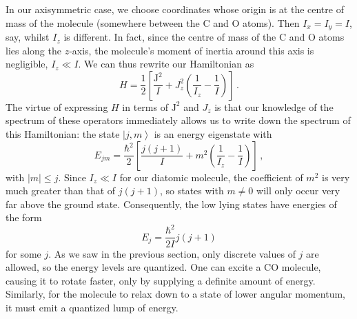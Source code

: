 \documentclass{article}
\theoremstyle{plain}\theoremheaderfont{\normalfont\itshape}\theorembodyfont{\rmfamily}\theoremseparator{.}\newtheorem*{rem}{Remark}\newtheorem*{ex}{Example}\newtheorem*{proof}{Proof}\newtheorem*{altp}{Alternative proof}
\theoremstyle{plain}\theoremheaderfont{\normalfont\bfseries}\theorembodyfont{\rmfamily}\theoremseparator{.}\newtheorem{thm}{Theorem}[section]\newtheorem{lem}[thm]{Lemma}\newtheorem{prop}[thm]{Proposition}\newtheorem*{cor}{Corollary}\newtheorem{defn}[thm]{Definition}\newtheorem{clm}[thm]{Claim}\newtheorem{clminproof}{Claim}
\theoremstyle{break}\theoremheaderfont{\normalfont\itshape}\theorembodyfont{\rmfamily}\theoremseparator{.\medskip}\newtheorem*{proofskip}{Proof}\newtheorem*{exs}{Examples}\newtheorem*{rems}{Remarks}
\theoremstyle{break}\theoremheaderfont{\normalfont\bfseries}\theorembodyfont{\rmfamily}\theoremseparator{.\medskip}\newtheorem{lemskip}[thm]{Lemma}\newtheorem{defnskip}[thm]{Definition}\newtheorem{propskip}[thm]{Proposition}\newtheorem{thmskip}[thm]{Theorem}
\numberwithin{equation}{section}
\newcommand{\ket}[1]{\left| #1 \right\rangle}
\newcommand{\vb}[1]{\bm{\mathrm{#1}}}
\newcommand{\abs}[1]{\left| #1 \right|}
\begin{document}
    In our axisymmetric case, we choose coordinates whose origin is at the centre of mass of the molecule (somewhere between the \(\mathrm{C}\) and \(\mathrm{O}\) atoms). Then \(I_x=I_y=I\), say, whilst \(I_z\) is different. In fact, since the centre of mass of the \(\mathrm{C}\) and \(\mathrm{O}\) atoms lies along the \(z\)-axis, the molecule's moment of inertia around this axis is negligible, \(I_z\ll I\). We can thus rewrite our Hamiltonian as
    \begin{equation}
        H=\frac{1}{2}\left[\frac{\vb{J}^2}{I}+J_z^2\left(\frac{1}{I_z}-\frac{1}{I}\right)\right]\,.
    \end{equation}
    The virtue of expressing \(H\) in terms of \(\vb{J}^2\) and \(J_z\) is that our knowledge of the spectrum of these operators immediately allows us to write down the spectrum of this Hamiltonian: the state \(\ket{j,m}\) is an energy eigenstate with
    \begin{equation}
        E_{jm}=\frac{\hbar^2}{2}\left[\frac{j(j+1)}{I}+m^2\left(\frac{1}{I_z}-\frac{1}{I}\right)\right]\,,
    \end{equation}
    with \(\abs{m}\le j\). Since \(I_z\ll I\) for our diatomic molecule, the coefficient of \(m^2\) is very much greater than that of \(j(j+1)\), so states with \(m\ne 0\) will only occur very far above the ground state. Consequently, the low lying states have energies of the form
    \begin{equation}
        E_j=\frac{\hbar^2}{2I}j(j+1)
    \end{equation}
    for some \(j\). As we saw in the previous section, only discrete values of \(j\) are allowed, so the energy levels are quantized. One can excite a \(\mathrm{CO}\) molecule, causing it to rotate faster, only by supplying a definite amount of energy. Similarly, for the molecule to relax down to a state of lower angular momentum, it must emit a quantized lump of energy.
    
\end{document}
